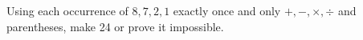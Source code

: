 Using each occurrence of $8,7,2,1$ exactly once and only $+,-,\times,\div$ and parentheses, make 24 or prove it impossible.

